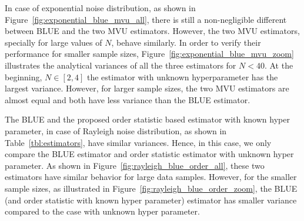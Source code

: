 \documentclass[journal]{IEEEtran}
\begin{document}
In case of exponential noise distribution, as shown in Figure~\ref{fig:exponential_blue_mvu_all}, there is still a non-negligible different between BLUE and the two MVU estimators. However, the two MVU estimators, specially for large values of $N$, behave similarly. In order to verify their performance for smaller sample sizes, Figure~\ref{fig:exponential_blue_mvu_zoom}  illustrates the analytical variances of all the three estimators for $N<40$. At the beginning, $N\in[2,4]$ the estimator with unknown hyperparameter has the largest variance. However, for larger sample sizes, the two MVU estimators are almost equal and both have less variance than the BLUE estimator.


The BLUE and the proposed order statistic based estimator with known hyper parameter, in case of Rayleigh noise distribution, as shown in Table~\ref{tbl:estimators}, have similar variances. Hence, in this case, we only compare the BLUE estimator and order statistic estimator with unknown hyper parameter. As shown in Figure~\ref{fig:rayleigh_blue_order_all}, these two estimators have similar behavior for large data samples. However, for the smaller sample sizes,  as illustrated in Figure~\ref{fig:rayleigh_blue_order_zoom}, the BLUE (and order statistic with known hyper parameter) estimator has smaller variance compared to the case with unknown hyper parameter.
%
%
\end{document}
